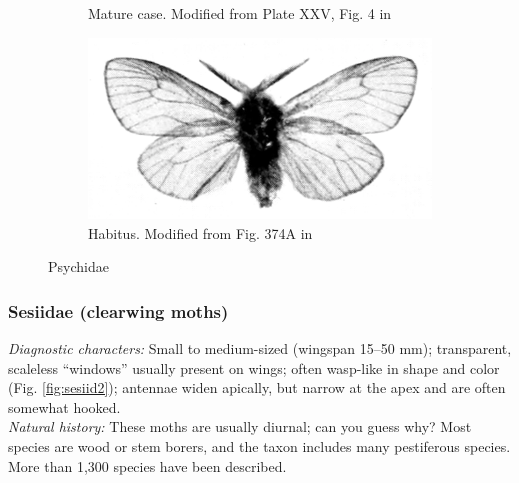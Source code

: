 \documentclass[letterpaper, 11pt]{article}
\begin{document}
\begin{figure}[ht!]
\begin{subfigure}[ht!]{0.13\textwidth}
        \caption{Mature case. Modified from Plate XXV, Fig. 4 in \cite{bhlitem82061AustrInsect}}
        \label{fig:psychid2}
    \end{subfigure}
    \hfill %
    \begin{subfigure}[ht!]{0.4\textwidth}
        \includegraphics[width=\textwidth]{PsychidHabitus.png}
        \caption{Habitus. Modified from Fig. 374A in \cite{escherich1914forstinsekten}}
        \label{fig:psychid3}
    \end{subfigure}
    \caption{Psychidae}\label{fig:psychids}
\end{figure}

\subsubsection{Sesiidae (clearwing moths)}
\noindent{}\textit{Diagnostic characters:} Small to medium-sized (wingspan 15--50 mm); transparent, scaleless ``windows'' usually present on wings; often wasp-like in shape and color (Fig. \ref{fig:sesiid2}); antennae widen apically, but narrow at the apex and are often somewhat hooked.\\

\noindent{}\textit{Natural history:} These moths are usually diurnal; can you guess why? Most species are wood or stem borers, and the taxon includes many pestiferous species. More than 1,300 species have been described.
\end{document}
